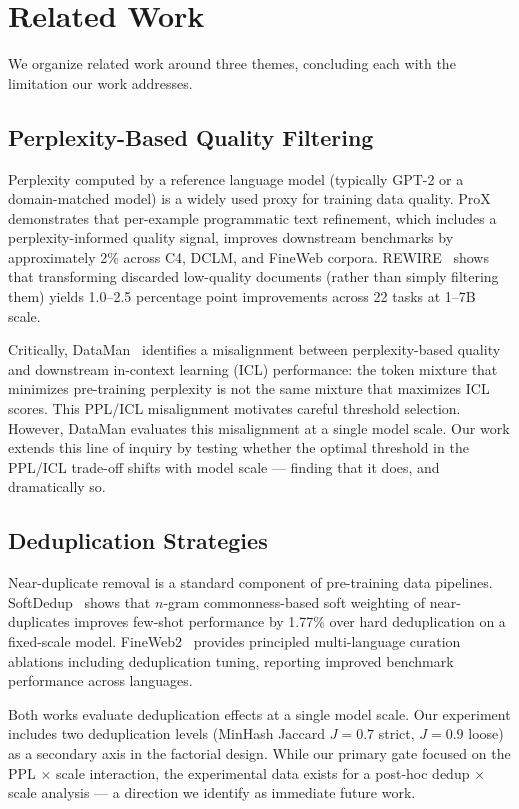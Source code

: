 \section{Related Work}
\label{sec:related}

We organize related work around three themes, concluding each with the limitation our work addresses.

\subsection{Perplexity-Based Quality Filtering}

Perplexity computed by a reference language model (typically GPT-2 or a domain-matched model) is a widely used proxy for training data quality. ProX~\cite{Zhou2024ProX} demonstrates that per-example programmatic text refinement, which includes a perplexity-informed quality signal, improves downstream benchmarks by approximately 2\% across C4, DCLM, and FineWeb corpora. REWIRE~\cite{Nguyen2025REWIRE} shows that transforming discarded low-quality documents (rather than simply filtering them) yields 1.0--2.5 percentage point improvements across 22 tasks at 1--7B scale.

Critically, DataMan~\cite{Peng2025DataMan} identifies a misalignment between perplexity-based quality and downstream in-context learning (ICL) performance: the token mixture that minimizes pre-training perplexity is not the same mixture that maximizes ICL scores. This PPL/ICL misalignment motivates careful threshold selection. However, DataMan evaluates this misalignment at a single model scale. Our work extends this line of inquiry by testing whether the optimal threshold in the PPL/ICL trade-off shifts with model scale --- finding that it does, and dramatically so.

\subsection{Deduplication Strategies}

Near-duplicate removal is a standard component of pre-training data pipelines. SoftDedup~\cite{He2024SoftDedup} shows that $n$-gram commonness-based soft weighting of near-duplicates improves few-shot performance by 1.77\% over hard deduplication on a fixed-scale model. FineWeb2~\cite{Penedo2025FineWeb2} provides principled multi-language curation ablations including deduplication tuning, reporting improved benchmark performance across languages.

Both works evaluate deduplication effects at a single model scale. Our experiment includes two deduplication levels (MinHash Jaccard $J{=}0.7$ strict, $J{=}0.9$ loose) as a secondary axis in the factorial design. While our primary gate focused on the PPL $\times$ scale interaction, the experimental data exists for a post-hoc dedup $\times$ scale analysis --- a direction we identify as immediate future work.

